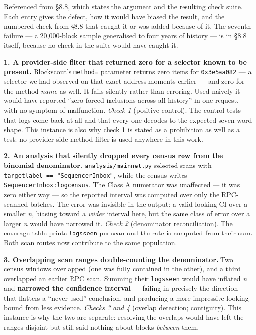 \documentclass[conference]{IEEEtran}
\renewcommand{\_}{\textunderscore\allowbreak}
\begin{document}
Referenced from §8.8, which states the argument and the resulting check
suite. Each entry gives the defect, how it would have biased the result,
and the numbered check from §8.8 that caught it or was added because of
it. The seventh failure --- a 20,000-block sample generalised to four
years of history --- is in §8.8 itself, because no check in the suite
would have caught it.

\textbf{1. A provider-side filter that returned zero for a selector
known to be present.} Blockscout's \texttt{method=} parameter returns
zero items for \texttt{0x3e5aa082} --- a selector we had observed on
that exact address moments earlier --- and zero for the method
\emph{name} as well. It fails silently rather than erroring. Used
naively it would have reported ``zero forced inclusions across all
history'' in one request, with no symptom of malfunction. \emph{Check 1}
(positive control). The control tests that logs come back at all and
that every one decodes to the expected seven-word shape. This instance
is also why check 1 is stated as a prohibition as well as a test: no
provider-side method filter is used anywhere in this work.

\textbf{2. An analysis that silently dropped every census row from the
binomial denominator.} \texttt{analysis/mainnet.py} selected scans with
\texttt{target\_label\ ==\ "SequencerInbox"}, while the census writes
\texttt{SequencerInbox:logcensus}. The Class A numerator was unaffected
--- it was zero either way --- so the reported interval was computed
over only the RPC-scanned batches. The error was invisible in the
output: a valid-looking CI over a smaller \emph{n}, biasing toward a
\emph{wider} interval here, but the same class of error over a larger
\emph{n} would have narrowed it. \emph{Check 2} (denominator
reconciliation). The coverage table prints \texttt{logs\_seen} per scan
and the rate is computed from their sum. Both scan routes now contribute
to the same population.

\textbf{3. Overlapping scan ranges double-counting the denominator.} Two
census windows overlapped (one was fully contained in the other), and a
third overlapped an earlier RPC scan. Summing their \texttt{logs\_seen}
would have inflated \emph{n} and \textbf{narrowed the confidence
interval} --- failing in precisely the direction that flatters a ``never
used'' conclusion, and producing a more impressive-looking bound from
less evidence. \emph{Checks 3 and 4} (overlap detection; contiguity).
This instance is why the two are separate: resolving the overlaps would
have left the ranges disjoint but still said nothing about blocks
\emph{between} them.
\end{document}
